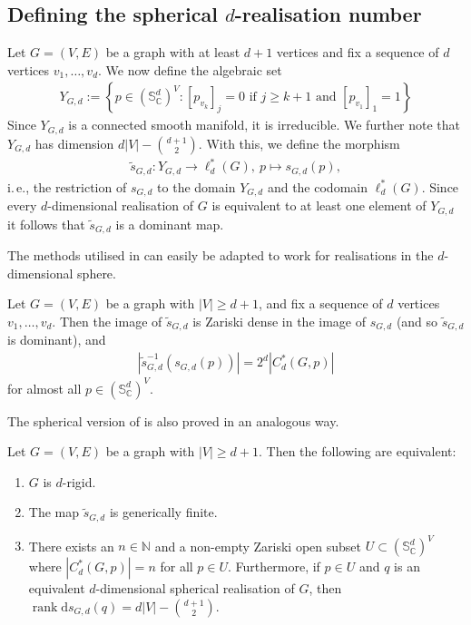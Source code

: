 \documentclass[ALCO]{cedram}
\DeclareMathOperator{\rank}{rank}
\newcommand{\diff}{\mathrm{d}}
\begin{document}
\subsection{Defining the spherical \texorpdfstring{$d$-realisation}{d-realisation} number}

Let $G=(V,E)$ be a graph with at least $d+1$ vertices and fix a sequence of $d$ vertices $v_1,\ldots, v_d$.
We now define the algebraic set
\begin{align}\label{eq:yset}
	Y_{G,d} := \left\{ p \in (\mathbb{S}^{d}_\mathbb{C})^V : [p_{v_k}]_j=0 \text{ if } j \geq k + 1 \text{ and }  [p_{v_1}]_1=1 \right\}
\end{align}
Since $Y_{G,d}$ is a connected smooth manifold,
it is irreducible.
We further note that $Y_{G,d}$ has dimension $d|V| - \binom{d+1}{2}$.
With this, we define the morphism
\begin{align*}
	\tilde{s}_{G,d} : Y_{G,d} \rightarrow \ell^*_d(G), ~ p \mapsto s_{G,d}(p),
\end{align*}
i.\,e., the restriction of $s_{G,d}$ to the domain $Y_{G,d}$ and the codomain $\ell^*_d(G)$.
Since every $d$-dimensional realisation of $G$ is equivalent to at least one element of $Y_{G,d}$ it follows that $\tilde{s}_{G,d}$ is a dominant map.

The methods utilised in  can easily be adapted to work for realisations in the $d$-dimensional sphere.

\begin{lemma}\label{l:ygd}
	Let $G=(V,E)$ be a graph with $|V| \geq d+1$,
	and fix a sequence of $d$ vertices $v_1,\ldots, v_d$.
	Then the image of $\tilde{s}_{G,d}$ is Zariski dense in the image of $s_{G,d}$ (and so $\tilde{s}_{G,d}$ is dominant),
	and
	\begin{align*}
		\left|\tilde{s}_{G,d}^{-1}\left(s_{G,d}(p) \right) \right| = 2^{d} |C^*_d(G,p)|
	\end{align*}
	for almost all $p \in (\mathbb{S}_\mathbb{C}^d)^V$.
\end{lemma}


The spherical version of  is also proved in an analogous way.


\begin{proposition}\label{p:domsphere}
	Let $G=(V,E)$ be a graph with $|V| \geq d+1$.
	Then the following are equivalent:
	\begin{enumerate}
		\item\label{p:domsphere1} $G$ is $d$-rigid.
		\item\label{p:domsphere2} The map $\tilde{s}_{G,d}$ is generically finite.
		\item\label{p:domsphere3} There exists an $n \in \mathbb{N}$ and a non-empty Zariski open subset $U \subset (\mathbb{S}_\mathbb{C}^d)^V$ where $ |C^*_d(G,p)|=n$ for all $p \in U$.
		Furthermore,
		if $p \in U$ and $q$ is an equivalent $d$-dimensional spherical realisation of $G$,
		then $\rank \diff s_{G,d}(q) =  d|V| - \binom{d+1}{2}$.
	\end{enumerate}
\end{proposition} 
\end{document}

